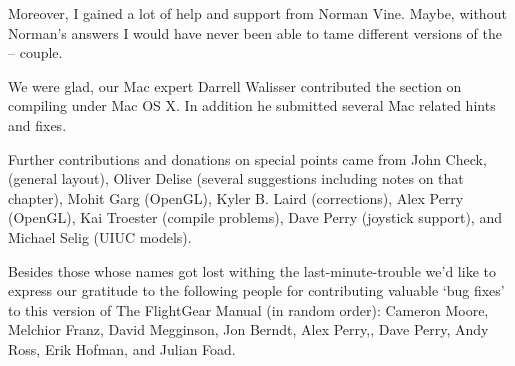 Moreover, I gained a lot of help and support from Norman Vine. Maybe,
without Norman's answers I would have never been able to tame different versions of the
\Cygwin{} -- \FlightGear{} couple.

We were glad, our Mac expert Darrell Walisser  contributed the section on compiling under Mac OS X. In addition he submitted several Mac related hints and fixes.

Further contributions and donations on special points came from John Check, (general layout), Oliver Delise  (several suggestions
including notes on that chapter), Mohit Garg  (OpenGL), Kyler B. Laird
 (corrections), Alex Perry (OpenGL), Kai
Troester (compile problems), Dave Perry  (joystick support), and Michael Selig (UIUC models).

Besides those whose names got lost withing the last-minute-trouble we'd
like to express our gratitude to the following people for contributing
valuable `bug fixes' to this version of The FlightGear Manual (in
random order): Cameron Moore, Melchior
Franz, David Megginson,
Jon Berndt, Alex Perry,, Dave
Perry, Andy Ross, Erik
Hofman, and Julian Foad.

\fi

